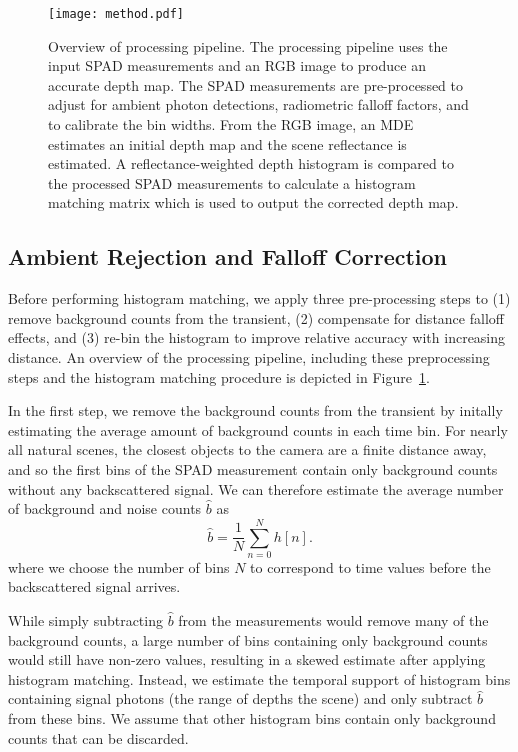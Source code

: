 \begin{figure}
  \centering
  \texttt{[image: method.pdf]}
  \caption{Overview of processing pipeline. The processing pipeline uses
      the input SPAD measurements and an RGB image to produce an accurate depth
      map. The SPAD measurements are pre-processed to adjust for ambient photon
      detections, radiometric falloff factors, and to calibrate the bin widths.
      From the RGB image, an MDE estimates an initial depth map
      and the scene reflectance is estimated. A reflectance-weighted
      depth histogram is compared to the processed SPAD measurements to
      calculate a histogram matching matrix which is used to output the corrected depth map.
  }
  \label{fig:pipeline}
\end{figure}

\subsection{Ambient Rejection and Falloff Correction} Before performing
histogram matching, we apply three pre-processing steps to (1)
remove background counts from the transient, (2) compensate for distance
falloff effects, and (3) re-bin the histogram to improve relative accuracy
with increasing distance. An overview of the processing pipeline, including
these preprocessing steps and the histogram matching procedure is depicted in
Figure~\ref{fig:pipeline}.

\vspace{0.8em}
In the first step, we remove the background counts from the
transient by initally estimating the average amount of background counts
in each time bin. For nearly all natural scenes, the closest objects to the
camera are a finite distance away, and so the first bins of the SPAD
measurement contain only background counts without any backscattered
signal. We can therefore estimate the
average number of background and noise counts $\hat{b}$ as 
%
\begin{equation}
  \hat b = \frac{1}{N}\sum_{n=0}^N h[n]. 
  \label{eq:ambient_estimate}
\end{equation}
%
where we choose the number of bins $N$ to correspond to time
values before the backscattered signal arrives. 

While simply subtracting $\hat{b}$ from the measurements would remove many of
the background counts, a large number of bins containing only background counts would still
have non-zero values, resulting in a skewed
estimate after applying histogram matching.  Instead, we estimate the temporal
support of histogram bins containing signal photons (\ie the range of depths the
scene) and only subtract $\hat{b}$ from these bins. We assume that other
histogram bins contain only background counts that can be discarded. 

